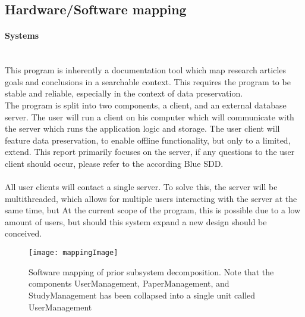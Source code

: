 \subsection{Hardware/Software mapping}
\paragraph{Systems}\mbox{}\\
This program is inherently a documentation tool which map research articles goals and conclusions in a searchable context. This requires the program to be stable and reliable, especially  in the context of data preservation. \\The program is split into two components, a client, and an external database  server. The user will run a client on his computer which will communicate with the server which runs the application logic and storage. The user client will feature data preservation, to enable offline functionality, but only to a limited, extend. This report primarily focuses on the server, if any questions to the user client should occur,  please refer to the according Blue SDD.\\ \\
All user clients will contact a single server. To solve this, the server will be multithreaded, which allows for multiple users interacting with the server at the same time, but  At the current scope of the program, this is possible due to a low amount of users, but should this system expand a new design should be conceived. \\
\begin{figure}[H]
	\texttt{[image: mappingImage]}
	\caption{ Software mapping of prior subsystem decomposition. Note that the components UserManagement, PaperManagement, and StudyManagement has been collapsed into a single unit called UserManagement }
\end{figure}
